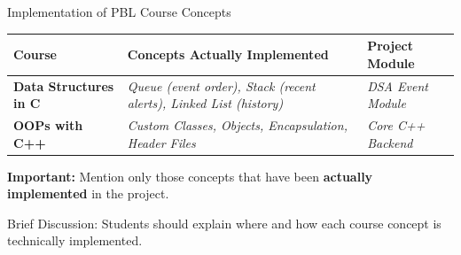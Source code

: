 \documentclass[aspectratio=169,11pt]{beamer}
\newcommand{\smallnote}[1]{%
\vspace{0.08cm}
{\scriptsize\color{GEUGrey}#1}
}
\newcommand{\placeholder}[1]{%
\textit{\color{GEUGrey}#1}
}
\begin{document}
\begin{frame}{Implementation of PBL Course Concepts}
\scriptsize
\begin{center}
\renewcommand{\arraystretch}{1.25}
\begin{tabularx}{.96\textwidth}{@{} >{\bfseries} p{3.0cm} X p{2.5cm} @{}}
\toprule
Course & Concepts Actually Implemented & Project Module \\ 
\midrule
Data Structures in C & \placeholder{Queue (event order), Stack (recent alerts), Linked List (history)} & \placeholder{DSA Event Module} \\ 
OOPs with C++ & \placeholder{Custom Classes, Objects, Encapsulation, Header Files} & \placeholder{Core C++ Backend} \\ 
\bottomrule
\end{tabularx}
\end{center}

\vfill
\begin{center}
\colorbox{GEULightBlue}{\parbox{.88\textwidth}{\centering \textbf{Important:} Mention only those concepts that have been \textbf{actually implemented} in the project.}}
\end{center}

\smallnote{Brief Discussion: Students should explain where and how each course concept is technically implemented.}
\end{frame}
\end{document}
